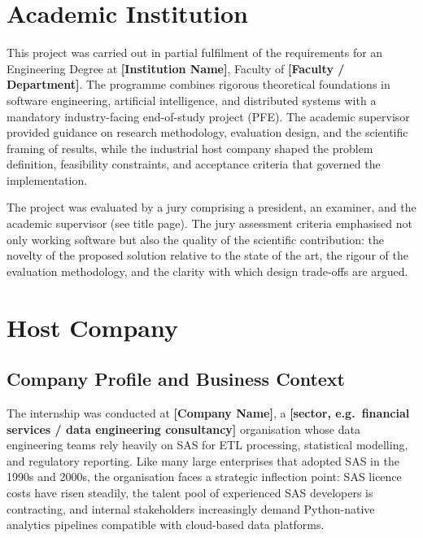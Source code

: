 \section{Academic Institution}
\label{sec:institution}

This project was carried out in partial fulfilment of the requirements for an
Engineering Degree at \textbf{[Institution Name]}, Faculty of
\textbf{[Faculty / Department]}. The programme combines rigorous theoretical
foundations in software engineering, artificial intelligence, and distributed
systems with a mandatory industry-facing end-of-study project (PFE). The
academic supervisor provided guidance on research methodology, evaluation
design, and the scientific framing of results, while the industrial host
company shaped the problem definition, feasibility constraints, and acceptance
criteria that governed the implementation.

The project was evaluated by a jury comprising a president, an examiner, and
the academic supervisor (see title page). The jury assessment criteria
emphasised not only working software but also the quality of the scientific
contribution: the novelty of the proposed solution relative to the state of
the art, the rigour of the evaluation methodology, and the clarity with which
design trade-offs are argued.

\section{Host Company}
\label{sec:host-company}

\subsection{Company Profile and Business Context}
\label{subsec:company-overview}

The internship was conducted at \textbf{[Company Name]}, a
\textbf{[sector, e.g.\ financial services / data engineering consultancy]}
organisation whose data engineering teams rely heavily on \ac{SAS} for
\ac{ETL} processing, statistical modelling, and regulatory reporting. Like
many large enterprises that adopted SAS in the 1990s and 2000s, the organisation
faces a strategic inflection point: SAS licence costs have risen steadily, the
talent pool of experienced SAS developers is contracting, and internal
stakeholders increasingly demand Python-native analytics pipelines compatible
with cloud-based data platforms.

